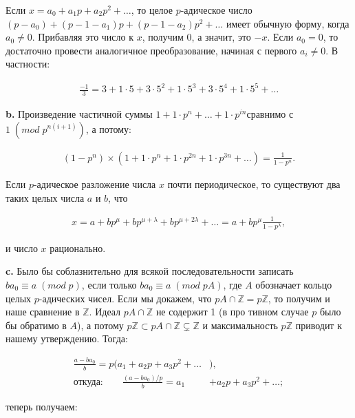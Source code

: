 \documentclass{mai_book}
\begin{document}
\medskip
\noindent Если $x=a_0+a_1p+a_2p^2+\dots$, то целое $p$-адическое число $(p-a_0)+(p-1-a_1)p+(p-1-a_2)p^2+\dots$ имеет обычную форму, когда $a_0\neq 0$.
Прибавляя это число к $x$, получим 0, а значит, это $-x$. Если $a_0=0$, то
достаточно провести аналогичное преобразование, начиная с первого
$a_i\neq 0$. В частности:

$$
\begin{aligned}
\frac{-1}{3}=3+1\cdot 5+3\cdot5^2+1\cdot 5^3+3\cdot5^4+1\cdot 5^5+\dots
\end{aligned}
$$

\medskip
\textbf{b.} Произведение частичной суммы $1+1\cdot p^n+\dots +1\cdot p^{in}$сравнимо с $1\; (mod\; p^{n(i+1)})$, а потому:

$$
\begin{aligned}
(1-p^n)\times (1+1\cdot p^n+1\cdot p^{2n}+1\cdot p^{3n}+\dots)=\frac{1}{1-p^n}.
\end{aligned}
$$

\medskip
\noindent Если $p$-адическое разложение числа $x$ почти периодическое, то существуют два таких целых числа $a$ и $b$, что

$$
\begin{aligned}
x=a+bp^{\mu}+bp^{\mu+\lambda}+bp^{\mu+2\lambda}+\dots=a+bp^{\mu}\frac{1}{1-p^\lambda},
\end{aligned}
$$

\medskip
\noindent и число $x$ рационально.

\medskip
\textbf{c.} Было бы соблазнительно для всякой последовательности записать $ba_0\equiv a\; (mod\; p)$, если только $ba_0\equiv a\; (mod\; pA)$, где $A$ обозначает
кольцо целых $p$-адических чисел. Если мы докажем, что $pA\cap \mathbb{Z}=p\mathbb{Z}$,
то получим и наше сравнение в $\mathbb{Z}$. Идеал $pA\cap \mathbb{Z}$ не содержит 1 (в про­
тивном случае $p$ было бы обратимо в $A$), а потому $p\mathbb{Z}\subset pA\cap \mathbb{Z}\subsetneq \mathbb{Z}$ и
максимальность $p\mathbb{Z}$ приводит к нашему утверждению. Тогда:

$$
\begin{aligned}
\frac{a-ba_0}{b}=p(a_1+a_2p+a_3p^2+\dots&),\\
\text{откуда:}\qquad \frac{(a-ba_0)/p}{b}=a_1&+a_2p+a_3p^2+\dots;
\end{aligned}
$$

\newpage


\noindent теперь получаем:
\end{document}
